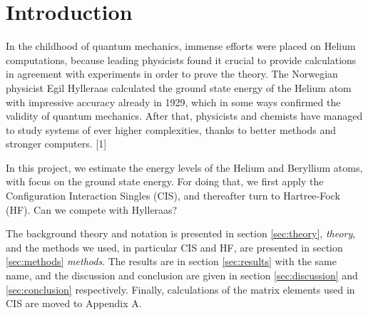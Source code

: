 \section{Introduction} \label{sec:introduction}
In the childhood of quantum mechanics, immense efforts were placed on Helium computations, because leading physicists found it crucial to provide calculations in agreement with experiments in order to prove the theory. The Norwegian physicist Egil Hylleraas calculated the ground state energy of the Helium atom with impressive accuracy already in 1929, which in some ways confirmed the validity of quantum mechanics. After that, physicists and chemists have managed to study systems of ever higher complexities, thanks to better methods and stronger computers. [1]

In this project, we estimate the energy levels of the Helium and Beryllium atoms, with focus on the ground state energy. For doing that, we first apply the Configuration Interaction Singles (CIS), and thereafter turn to Hartree-Fock (HF). Can we compete with Hylleraas?

The background theory and notation is presented in section \eqref{sec:theory}, \textit{theory}, and the methods we used, in particular CIS and HF, are presented in section \eqref{sec:methods} \textit{methods}. The results are in section \eqref{sec:results} with the same name, and the discussion and conclusion are given in section \eqref{sec:discussion} and \eqref{sec:conclusion} respectively. Finally, calculations of the matrix elements used in CIS are moved to Appendix A.
